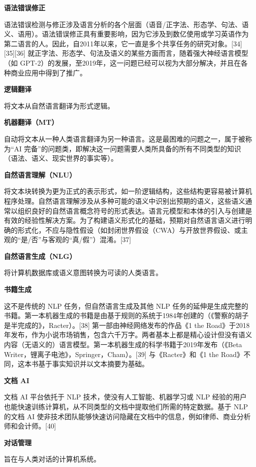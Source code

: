 \textbf{语法错误修正}  

语法错误检测与修正涉及语言分析的各个层面（语音/正字法、形态学、句法、语义、语用）。语法错误修正具有重要影响，因为它涉及到数亿使用或学习英语作为第二语言的人。因此，自2011年以来，它一直是多个共享任务的研究对象。[34][35][36] 就正字法、形态学、句法及语义的某些方面而言，随着强大神经语言模型（如 GPT-2）的发展，至2019年，这一问题已经可以视为大部分解决，并且在各种商业应用中得到了推广。

\textbf{逻辑翻译}  

将文本从自然语言翻译为形式逻辑。

\textbf{机器翻译（MT）}  

自动将文本从一种人类语言翻译为另一种语言。这是最困难的问题之一，属于被称为“AI 完备”的问题类，即解决这一问题需要人类所具备的所有不同类型的知识（语法、语义、现实世界的事实等）。

\textbf{自然语言理解（NLU）}  

将文本块转换为更为正式的表示形式，如一阶逻辑结构，这些结构更容易被计算机程序处理。自然语言理解涉及从多种可能的语义中识别出预期的语义，这些语义通常以组织良好的自然语言概念符号的形式表达。语言元模型和本体的引入与创建是有效的经验性解决方案。为了构建语义形式化的基础，预期对自然语言语义进行明确的形式化，不应与隐性假设（如封闭世界假设（CWA）与开放世界假设、或主观的“是/否”与客观的“真/假”）混淆。[37]

\textbf{自然语言生成（NLG）}  

将计算机数据库或语义意图转换为可读的人类语言。

\textbf{书籍生成} 

这不是传统的 NLP 任务，但自然语言生成及其他 NLP 任务的延伸是生成完整的书籍。第一本机器生成的书籍是由基于规则的系统于1984年创建的（《警察的胡子是半完成的》，Racter）。[38] 第一部由神经网络发布的作品《1 the Road》于2018年发布，作为小说市场销售，包含六千万字。两者基本上都是精心设计但没有语义内容（无语义的）语言模型。第一本机器生成的科学书籍于2019年发布（《Beta Writer，锂离子电池》，Springer，Cham）。[39] 与《Racter》和《1 the Road》不同，这本书基于事实知识并以文本摘要为基础。

\textbf{文档 AI}  

文档 AI 平台依托于 NLP 技术，使没有人工智能、机器学习或 NLP 经验的用户也能快速训练计算机，从不同类型的文档中提取他们所需的特定数据。基于 NLP 的文档 AI 使非技术团队能够快速访问隐藏在文档中的信息，例如律师、商业分析师和会计师。[40]

\textbf{对话管理}  

旨在与人类对话的计算机系统。

